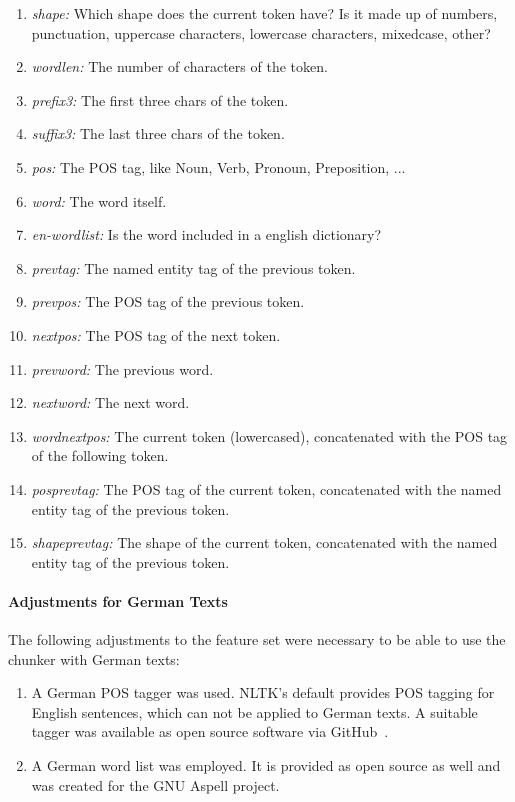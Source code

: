 		\begin{enumerate}
			\item \textit{shape:} Which shape does the current token have? Is it made up of numbers, punctuation, uppercase characters, lowercase characters, mixedcase, other?
			\item \textit{wordlen:} The number of characters of the token.
			\item \textit{prefix3:} The first three chars of the token.
			\item \textit{suffix3:} The last three chars of the token.
			\item \textit{pos:} The \ac{POS} tag, like Noun, Verb, Pronoun, Preposition, ...
			\item \textit{word:} The word itself.
			\item \textit{en-wordlist:} Is the word included in a english dictionary?
			\item \textit{prevtag:} The named entity tag of the previous token.
			\item \textit{prevpos:} The \ac{POS} tag of the previous token.
			\item \textit{nextpos:} The \ac{POS} tag of the next token.
			\item \textit{prevword:} The previous word.
			\item \textit{nextword:} The next word.
			\item \textit{word\+nextpos:} The current token (lowercased), concatenated with the \ac{POS} tag of the following token.
			\item \textit{pos\+prevtag:} The \ac{POS} tag of the current token, concatenated with the named entity tag of the previous token.
			\item \textit{shape\+prevtag:} The shape of the current token, concatenated with the named entity tag of the previous token.
		\end{enumerate}

		\paragraph{Adjustments for German Texts}
		The following adjustments to the feature set were necessary to be able to use the chunker with German texts:

		\begin{enumerate}
			\item A German \ac{POS} tagger was used. \ac{NLTK}'s default provides \ac{POS} tagging for English sentences, which can not be applied to German texts. A suitable tagger was available as open source software via GitHub~\cite{nltkClassifierBasedGermanTagger}.
			\item A German word list was employed. It is provided as open source as well and was created for the GNU Aspell project.~\cite{gnuAspellGermanWordlist}
		\end{enumerate}

